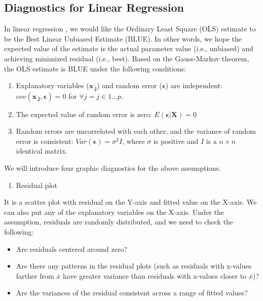 \documentclass[
  12pt,
]{krantz}
\providecommand{\tightlist}{%
  \setlength{\itemsep}{0pt}\setlength{\parskip}{0pt}}
\begin{document}
\hypertarget{diagnostics-for-linear-regression}{%
\subsection{Diagnostics for Linear Regression}\label{diagnostics-for-linear-regression}}

In linear regression , we would like the Ordinary Least Square (OLS)  estimate to be the Best Linear Unbiased Estimate (BLUE). In other words, we hope the expected value of the estimate is the actual parameter value (i.e., unbiased) and achieving minimized residual (i.e., best). Based on the Gauss-Markov theorem, the OLS  estimate is BLUE  under the following conditions:

\begin{enumerate}
\def\labelenumi{\arabic{enumi}.}
\item
  Explanatory variables (\(\mathbf{x_{.j}}\)) and random error (\(\symbf{\epsilon}\)) are independent: \(cov(\symbf{x_{.j},\epsilon})=0\) for \(\forall j=j\in1...p\).
\item
  The expected value of random error is zero: \(E(\symbf{\epsilon|X})=0\)
\item
  Random errors are uncorrelated with each other, and the variance of random error is consistent: \(Var(\symbf{\epsilon})=\sigma^{2}I\), where \(\sigma\) is positive and \(I\) is a \(n \times n\) identical matrix.
\end{enumerate}

We will introduce four graphic diagnostics for the above assumptions.

\begin{enumerate}
\def\labelenumi{(\arabic{enumi})}
\tightlist
\item
  Residual plot 
\end{enumerate}

It is a scatter plot with residual on the Y-axis and fitted value on the X-axis. We can also put any of the explanatory variables on the X-axis. Under the assumption, residuals are randomly distributed, and we need to check the following:

\begin{itemize}
\tightlist
\item
  Are residuals centered around zero?
\item
  Are there any patterns in the residual plots (such as residuals with x-values farther from \(\bar{x}\) have greater variance than residuals with x-values closer to \(\bar{x}\))?
\item
  Are the variances of the residual consistent across a range of fitted values?
\end{itemize}
\end{document}
